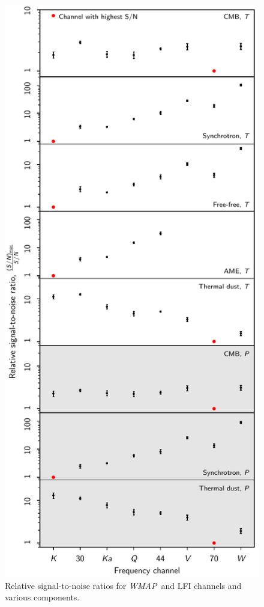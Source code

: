 \documentclass[twocolumn]{../../common/aa}
\def\WMAP{\emph{WMAP}}
\begin{document}
\begin{figure}
  \center	
  \includegraphics[width=\linewidth]{figures/fg_s2n_v1.pdf}
  \caption{Relative signal-to-noise ratios for \WMAP\ and LFI channels and various components. }
  \label{fig:fg_s2n}
\end{figure}
\end{document}
